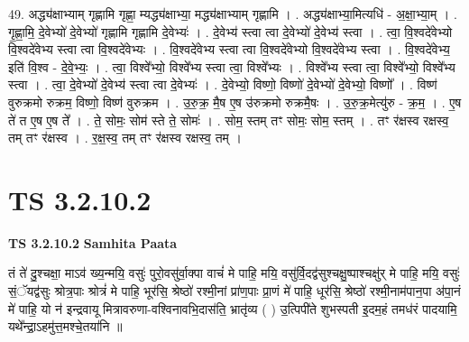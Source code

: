 \documentclass[17pt]{extarticle}
\begin{document}
49. अद्ध्य॑क्षाभ्याम् गृह्णामि गृह्णा॒ म्यद्ध्य॑क्षाभ्या॒ मद्ध्य॑क्षाभ्याम् गृह्णामि । . अद्ध्य॑क्षाभ्या॒मित्यधि॑ - अ॒क्षा॒भ्या॒म् । . गृ॒ह्णा॒मि॒ दे॒वेभ्यो॑ दे॒वेभ्यो॑ गृह्णामि गृह्णामि दे॒वेभ्यः॑ । . दे॒वेभ्य॑ स्त्वा त्वा दे॒वेभ्यो॑ दे॒वेभ्य॑ स्त्वा । . त्वा॒ वि॒श्वदे॑वेभ्यो वि॒श्वदे॑वेभ्य स्त्वा त्वा वि॒श्वदे॑वेभ्यः । . वि॒श्वदे॑वेभ्य स्त्वा त्वा वि॒श्वदे॑वेभ्यो वि॒श्वदे॑वेभ्य स्त्वा । . वि॒श्वदे॑वेभ्य॒ इति॑ वि॒श्व - दे॒वे॒भ्यः॒ । . त्वा॒ विश्वे᳚भ्यो॒ विश्वे᳚भ्य स्त्वा त्वा॒ विश्वे᳚भ्यः । . विश्वे᳚भ्य स्त्वा त्वा॒ विश्वे᳚भ्यो॒ विश्वे᳚भ्य स्त्वा । . त्वा॒ दे॒वेभ्यो॑ दे॒वेभ्य॑ स्त्वा त्वा दे॒वेभ्यः॑ । . दे॒वेभ्यो॒ विष्णो॒ विष्णो॑ दे॒वेभ्यो॑ दे॒वेभ्यो॒ विष्णो᳚ । . विष्ण॑ वुरुक्रमो रुक्रम॒ विष्णो॒ विष्ण॑ वुरुक्रम । . उ॒रु॒क्र॒ मै॒ष ए॒ष उ॑रुक्रमो रुक्रमै॒षः । . उ॒रु॒क्र॒मेत्यु॑रु - क्र॒म॒ । . ए॒ष ते॑ त ए॒ष ए॒ष ते᳚ । . ते॒ सोमः॒ सोम॑ स्ते ते॒ सोमः॑ । . सोम॒ स्तम् तꣳ सोमः॒ सोम॒ स्तम् । . तꣳ र॑क्षस्व रक्षस्व॒ तम् तꣳ र॑क्षस्व । . र॒क्ष॒स्व॒ तम् तꣳ र॑क्षस्व रक्षस्व॒ तम् । \newline


\section{ TS 3.2.10.2 }

\textbf{TS 3.2.10.2 } \newline
\textbf{Samhita Paata} \newline

तं ते॑ दु॒श्चक्षा॒ माऽव॑ ख्य॒न्मयि॒ वसुः॑ पुरो॒वसु॑र्वा॒क्पा वाचं॑ मे पाहि॒ मयि॒ वसु॑र्वि॒दद्व॑सुश्चक्षु॒ष्पाश्चक्षु॑र् मे पाहि॒ मयि॒ वसुः॑ सं॒ॅयद्व॑सुः श्रोत्र॒पाः श्रोत्रं॑ मे पाहि॒ भूर॑सि॒ श्रेष्ठो॑ रश्मी॒नां प्रा॑ण॒पाः प्रा॒णं मे॑ पाहि॒ धूर॑सि॒ श्रेष्ठो॑ रश्मी॒नाम॑पान॒पा अ॑पा॒नं मे॑ पाहि॒ यो न॑ इन्द्रवायू मित्रावरुणा-वश्विनावभि॒दास॑ति॒ भ्रातृ॑व्य ( ) उ॒त्पिपी॑ते शुभस्पती इ॒दम॒हं तमध॑रं पादयामि॒ यथे᳚न्द्रा॒ऽहमु॑त्त॒मश्चे॒तया॑नि ॥ \newline
\end{document}

